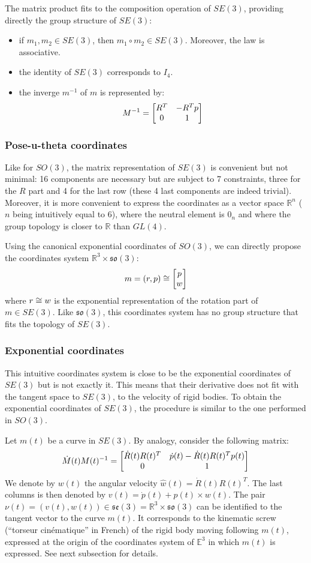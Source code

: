 \documentclass{book}
\begin{document}
The matrix product fits to the composition operation of $SE(3)$, providing directly the group structure of $SE(3)$:
\begin{itemize}
\item if $m_1,m_2 \in SE(3)$, then $m_1 \circ m_2 \in SE(3)$. Moreover, the law is associative.
\item the identity of $SE(3)$ corresponds to $I_4$.
\item the inverge $m^{-1}$ of $m$ is represented by:
\[ M^{-1} = \begin{bmatrix} R^T & -R^T p \\ 0 & 1 \end{bmatrix} \]
\end{itemize}

\subsubsection{Pose-u-theta coordinates}

Like for $SO(3)$, the matrix representation of $SE(3)$ is convenient but not minimal: 16 components are necessary but are subject to 7 constraints, three for the $R$ part and 4 for the last row (these 4 last components are indeed trivial). Moreover, it is more convenient to express the coordinates as a vector space $\mathbb{R}^n$ ($n$ being intuitively equal to 6), where the neutral element is $0_n$ and where the group topology is closer to $\mathbb{R}$ than $GL(4)$.

Using the canonical exponential coordinates of $SO(3)$, we can directly propose the coordinates system $\mathbb{R}^3 \times \mathfrak{so}(3)$:
\[ m = (r,p) \cong \begin{bmatrix} p \\ w \end{bmatrix} \]
where $r \cong w$ is the exponential representation of the rotation part of $m \in SE(3)$. Like $\mathfrak{so}(3)$, this coordinates system has no group structure that fits the topology of $SE(3)$.

\subsubsection{Exponential coordinates}

This intuitive coordinates system is close to be the exponential coordinates of $SE(3)$ but is not exactly it. This means that their derivative does not fit with the tangent space to $SE(3)$, \mie to the velocity of rigid bodies. To obtain the exponential coordinates of $SE(3)$, the procedure is similar to the one performed in $SO(3)$. 

Let $m(t)$ be a curve in $SE(3)$. By analogy, consider the following matrix:
\[ \dot{M}(t) M(t)^{-1} = \begin{bmatrix} \dot{R}(t) R(t)^T & \dot{p}(t) - \dot{R}(t) R(t)^T p(t) \\ 0&1 \end{bmatrix} \]
We denote by $w(t)$ the angular velocity $\hat{w}(t) = \dot{R}(t) R(t)^T$. The last columns is then denoted by $v(t) = \dot{p}(t) + p(t) \times w(t)$. The pair $\nu(t) = (v(t),w(t)) \in \mathfrak{se}(3) = \mathbb{R}^3 \times \mathfrak{so}(3)$ can be identified to the tangent vector to the curve $m(t)$. It corresponds to the kinematic screw (``torseur cin\'ematique'' in French) of the rigid body moving following $m(t)$, expressed at the origin of the coordinates system of $\mathbb{E}^3$ in which $m(t)$ is expressed. See next subsection for details.
\end{document}
